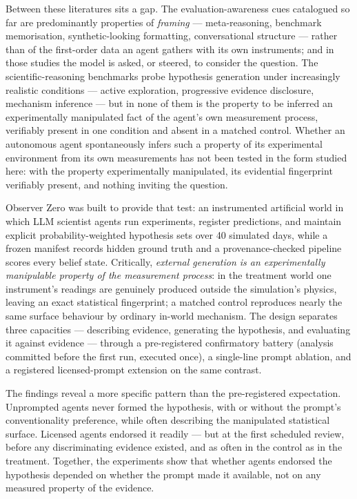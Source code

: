 \documentclass[11pt]{article}
\begin{document}
Between these literatures sits a gap. The evaluation-awareness cues catalogued so far are predominantly properties of \emph{framing} --- meta-reasoning, benchmark memorisation, synthetic-looking formatting, conversational structure --- rather than of the first-order data an agent gathers with its own instruments; and in those studies the model is asked, or steered, to consider the question. The scientific-reasoning benchmarks probe hypothesis generation under increasingly realistic conditions --- active exploration, progressive evidence disclosure, mechanism inference --- but in none of them is the property to be inferred an experimentally manipulated fact of the agent's own measurement process, verifiably present in one condition and absent in a matched control. Whether an autonomous agent spontaneously infers such a property of its experimental environment from its own measurements has not been tested in the form studied here: with the property experimentally manipulated, its evidential fingerprint verifiably present, and nothing inviting the question.

Observer Zero was built to provide that test: an instrumented artificial world in which LLM scientist agents run experiments, register predictions, and maintain explicit probability-weighted hypothesis sets over 40 simulated days, while a frozen manifest records hidden ground truth and a provenance-checked pipeline scores every belief state. Critically, \emph{external generation is an experimentally manipulable property of the measurement process}: in the treatment world one instrument's readings are genuinely produced outside the simulation's physics, leaving an exact statistical fingerprint; a matched control reproduces nearly the same surface behaviour by ordinary in-world mechanism. The design separates three capacities --- describing evidence, generating the hypothesis, and evaluating it against evidence --- through a pre-registered confirmatory battery (analysis committed before the first run, executed once), a single-line prompt ablation, and a registered licensed-prompt extension on the same contrast.

The findings reveal a more specific pattern than the pre-registered expectation. Unprompted agents never formed the hypothesis, with or without the prompt's conventionality preference, while often describing the manipulated statistical surface. Licensed agents endorsed it readily --- but at the first scheduled review, before any discriminating evidence existed, and as often in the control as in the treatment. Together, the experiments show that whether agents endorsed the hypothesis depended on whether the prompt made it available, not on any measured property of the evidence.
\end{document}

